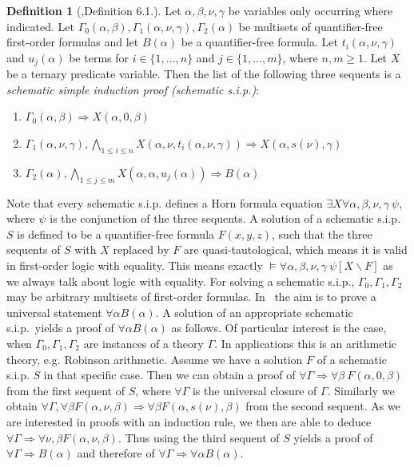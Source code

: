 \documentclass[acmsmall]{acmart}
\theoremstyle{plain}
\theoremstyle{definition}
\newtheorem{definition}[theorem]{Definition}
\begin{document}
\begin{definition}[\cite{Eberhard15Inductive},Definition 6.1.]\label{inductiveSchematicSip}
	Let $\alpha,\beta,\nu,\gamma$ be variables only occurring where indicated. Let $\Gamma_0(\alpha,\beta),\Gamma_1(\alpha,\nu,\gamma),\Gamma_2(\alpha)$ be multisets of quantifier-free first-order formulas and let $B(\alpha)$ be a quantifier-free formula. Let $t_i(\alpha,\nu,\gamma)$ and $u_j(\alpha)$ be terms for $i \in \{1,...,n\}$ and $j \in \{1,...,m\}$, where $n,m \geq 1$. Let $X$ be a ternary predicate variable. Then the list of the following three sequents is a \emph{schematic simple induction proof (schematic s.i.p.)}:
	\begin{enumerate}
		\item $\Gamma_0(\alpha,\beta) \Rightarrow X(\alpha,0,\beta)$
		\item $\Gamma_1(\alpha,\nu,\gamma), \bigwedge_{1\leq i \leq n}X(\alpha,\nu,t_i(\alpha,\nu,\gamma)) \Rightarrow X(\alpha,s(\nu),\gamma)$
		\item $\Gamma_2(\alpha), \bigwedge_{1\leq j \leq m} X(\alpha,\alpha,u_j(\alpha)) \Rightarrow B(\alpha)$
	\end{enumerate}	
\end{definition}

Note that every schematic s.i.p. defines a  Horn formula equation $\exists X \forall \alpha,\beta,\nu,\gamma ~ \psi$, where $\psi$ is the conjunction of the three sequents. A solution of a schematic s.i.p. $S$ is defined to be a quantifier-free formula $F(x,y,z)$, such that the three sequents of $S$ with $X$ replaced by $F$ are quasi-tautological, which means it is valid in first-order logic with equality. This means exactly $\models \forall \alpha,\beta,\nu,\gamma ~\psi[X\backslash F]$ as we always talk about logic with equality.
For solving a schematic s.i.p., $\Gamma_0,\Gamma_1,\Gamma_2$ may be arbitrary multisets of
 first-order formulas.
In~\cite{Eberhard15Inductive} the aim is to prove a universal statement $\forall \alpha B(\alpha)$.
A solution of an appropriate schematic s.i.p.\ yields a proof of $\forall \alpha B(\alpha)$ as follows.
Of particular interest is the case, when $\Gamma_0,\Gamma_1,\Gamma_2$ are instances of a theory
 $\Gamma$.
In applications this is an arithmetic theory, e.g. Robinson arithmetic.
Assume we have a solution $F$ of a schematic s.i.p. $S$ in that specific case.
Then we can obtain a proof of $\forall \Gamma \Rightarrow \forall \beta ~F(\alpha,0,\beta)$ from the
 first sequent of $S$, where $\forall \Gamma$ is the universal closure of $\Gamma$.
Similarly we obtain $\forall \Gamma, \forall \beta F(\alpha,\nu, \beta) \Rightarrow \forall \beta F(\alpha,s(\nu),\beta)$
 from the second sequent.
As we are interested in proofs with an induction rule, we then are able to deduce
 $\forall \Gamma \Rightarrow \forall \nu,\beta F(\alpha, \nu, \beta)$.
Thus using the third sequent of $S$ yields a proof of $\forall \Gamma \Rightarrow B(\alpha)$ and
 therefore of $\forall \Gamma \Rightarrow \forall \alpha B(\alpha)$.
\end{document}
